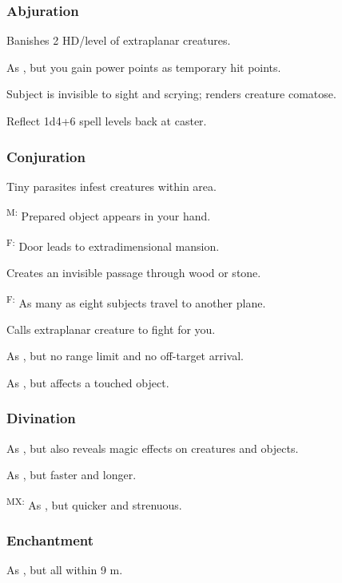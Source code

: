 \subsubsection{Abjuration}
	 Banishes 2 HD/level of extraplanar creatures.

	 As , but you gain power points as temporary hit points.

	 Subject is invisible to sight and scrying; renders creature comatose.

	 Reflect 1d4+6 spell levels back at caster.

\subsubsection{Conjuration}
	 Tiny parasites infest creatures within area. %

	\textsuperscript{M:} Prepared object appears in your hand.

	\textsuperscript{F:} Door leads to extradimensional mansion.

	 Creates an invisible passage through wood or stone.

	\textsuperscript{F:} As many as eight subjects travel to another plane.

	 Calls extraplanar creature to fight for you.

	 As , but no range limit and no off-target arrival.

	 As , but affects a touched object.

\subsubsection{Divination}
	 As , but also reveals magic effects on creatures and objects.

	 As , but faster and longer.

	\textsuperscript{MX:} As , but quicker and strenuous.

\subsubsection{Enchantment}
	 As , but all within 9 m.

